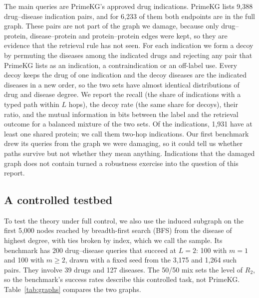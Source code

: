 The main queries are PrimeKG's approved drug indications. PrimeKG lists 9,388
drug--disease indication pairs, and for 6,233 of them both endpoints are in the
full graph. These pairs are not part of the graph we damage, because only
drug--protein, disease--protein and protein--protein edges were kept, so they
are evidence that the retrieval rule has not seen. For each indication we form a
decoy by permuting the diseases among the indicated drugs and rejecting any pair
that PrimeKG lists as an indication, a contraindication or an off-label use.
Every decoy keeps the drug of one indication and the decoy diseases are the
indicated diseases in a new order, so the two sets have almost identical
distributions of drug and disease degree. We report the recall (the share of
indications with a typed path within $L$ hops), the decoy rate (the same share
for decoys), their ratio, and the mutual information in bits between the label
and the retrieval outcome for a balanced mixture of the two sets. Of the
indications, 1,931 have at least one shared protein; we call them two-hop
indications. Our first benchmark drew its queries from the graph we were
damaging, so it could tell us whether paths survive but not whether they mean
anything. Indications that the damaged graph does not contain turned a
robustness exercise into the question of this report.

\subsection{A controlled testbed}
\label{sec:data-sample}

To test the theory under full control, we also use the induced subgraph on the
first 5,000 nodes reached by breadth-first search (BFS) from the disease of
highest degree, with ties broken by index, which we call the sample. Its
benchmark has 200 drug--disease queries that succeed at $L=2$: 100 with $m=1$
and 100 with $m\ge2$, drawn with a fixed seed from the 3,175 and 1,264 such
pairs. They involve 39 drugs and 127 diseases. The 50/50 mix sets the level of
$R_2$, so the benchmark's success rates describe this controlled task, not
PrimeKG. Table~\ref{tab:graphs} compares the two graphs.

